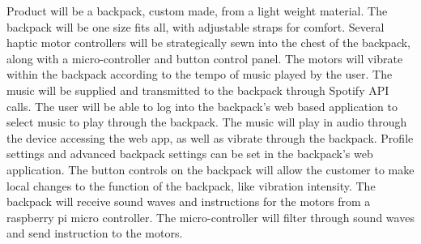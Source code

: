 Product will be a backpack, custom made, from a light weight material. The backpack will be one size fits all, with adjustable straps for comfort. Several haptic motor controllers will be strategically sewn into the chest of the backpack, along with a micro-controller and button control panel. The motors will vibrate within the backpack according to the tempo of music played by the user. The music will be supplied and transmitted to the backpack through Spotify API calls. The user will be able to log into the backpack’s web based application to select music to play through the backpack. The music will play in audio through the device accessing the web app, as well as vibrate through the backpack. Profile settings and advanced backpack settings can be set in the backpack’s web application. The button controls on the backpack will allow the customer to make local changes to the function of the backpack, like vibration intensity. The backpack will receive sound waves and instructions for the motors from a raspberry pi micro controller. The micro-controller will filter through sound waves and send instruction to the motors.